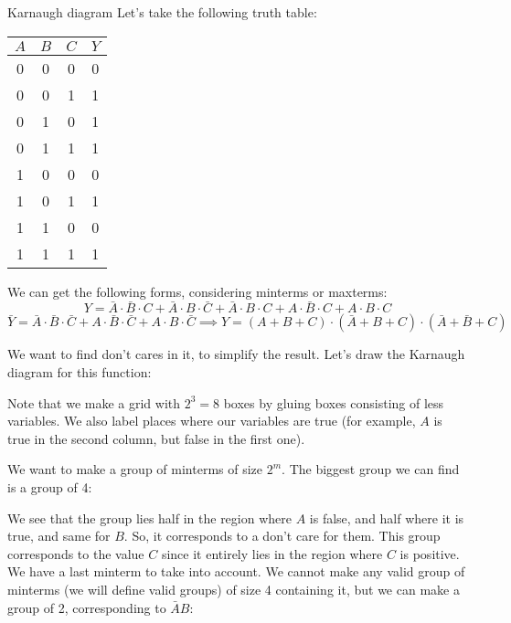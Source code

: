 \documentclass[a4paper]{article}
\begin{document}
\begin{parag}{Karnaugh diagram}
    Let's take the following truth table:
    \begin{center}
        \begin{tabular}{c|c|c|c}
            $A$ & $B$ & $C$ & $Y$ \\
            \hline
            0 & 0 & 0 & 0 \\
            0 & 0 & 1 & 1 \\
            0 & 1 & 0 & 1 \\
            0 & 1 & 1 & 1 \\
            1 & 0 & 0 & 0 \\
            1 & 0 & 1 & 1 \\
            1 & 1 & 0 & 0 \\
            1 & 1 & 1 & 1 \\
        \end{tabular}
    \end{center}

    We can get the following forms, considering minterms or maxterms: 
    \[Y = \bar{A} \cdot \bar{B} \cdot C + \bar{A} \cdot B \cdot \bar{C} + \bar{A} \cdot B \cdot C + A\cdot \bar{B} \cdot C + A\cdot B\cdot C\]
    \[\bar{Y} = \bar{A} \cdot \bar{B} \cdot \bar{C} + A\cdot \bar{B} \cdot \bar{C} + A\cdot B\cdot \bar{C} \implies Y = \left(A + B + C\right) \cdot \left(\bar{A}+ B + C\right) \cdot \left(\bar{A} + \bar{B} + C\right)\]
    
    We want to find don't cares in it, to simplify the result. Let's draw the Karnaugh diagram for this function:

    Note that we make a grid with $2^3 = 8$ boxes by gluing boxes consisting of less variables. We also label places where our variables are true (for example, $A$ is true in the second column, but false in the first one). 

    We want to make a group of minterms of size $2^m$. The biggest group we can find is a group of 4:

    We see that the group lies half in the region where $A$ is false, and half where it is true, and same for $B$. So, it corresponds to a don't care for them. This group corresponds to the value $C$ since it entirely lies in the region where $C$ is positive. We have a last minterm to take into account. We cannot make any valid group of minterms (we will define valid groups) of size 4 containing it, but we can make a group of 2, corresponding to $\bar{A} B$:


\end{parag}
\end{document}
